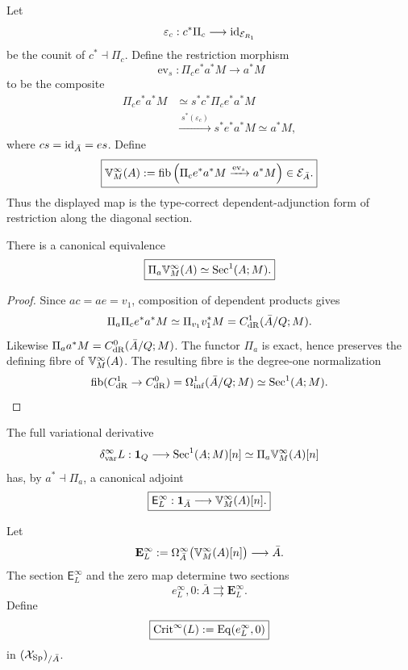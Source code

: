\begin{definition}
\label{def:var-full-local-coefficient}
Let
\[
    \varepsilon_c:
    c^*\Pi_c
    \longrightarrow
    \operatorname{id}_{\mathcal E_{R_1}}
\]
be the counit of \(c^*\dashv\Pi_c\).  Define the restriction morphism
\[
    \boxed{
    \operatorname{ev}_s:
    \Pi_ce^*a^*M
    \longrightarrow
    a^*M
    }
\]
to be the composite
\[
\begin{aligned}
    \Pi_ce^*a^*M
    &\simeq
    s^*c^*\Pi_ce^*a^*M\\
    &\xrightarrow{\;s^*(\varepsilon_c)\;}
    s^*e^*a^*M
    \simeq
    a^*M,
\end{aligned}
\]
where \(cs=\operatorname{id}_{\bar A}=es\).  Define
\[
    \boxed{
    \mathbb V^{\infty}_M(A)
    :=
    \operatorname{fib}\left(
      \Pi_c e^*a^*M
      \xrightarrow{\operatorname{ev}_s}
      a^*M
    \right)
    \in\mathcal E_{\bar A}.
    }
\]
Thus the displayed map is the type-correct dependent-adjunction form of restriction along the diagonal section.
\end{definition}

\begin{proposition}
\label{prop:var-full-local-pushforward}
There is a canonical equivalence
\[
    \boxed{
    \Pi_a\mathbb V^{\infty}_M(A)
    \simeq
    \operatorname{Sec}^1(A;M).
    }
\]
\end{proposition}

\begin{proof}
Since \(ac=ae=v_1\), composition of dependent products gives
\[
    \Pi_a\Pi_c e^*a^*M
    \simeq
    \Pi_{v_1}v_1^*M
    =
    C_{\mathrm{dR}}^1(\bar A/Q;M).
\]
Likewise \(\Pi_aa^*M=C_{\mathrm{dR}}^0(\bar A/Q;M)\). The functor \(\Pi_a\) is exact, hence preserves the defining fibre of \(\mathbb V^{\infty}_M(A)\). The resulting fibre is the degree-one normalization
\[
    \operatorname{fib}(C_{\mathrm{dR}}^1\to C_{\mathrm{dR}}^0)
    =
    \Omega_{\mathrm{inf}}^1(\bar A/Q;M)
    \simeq
    \operatorname{Sec}^1(A;M).
\]
\end{proof}

\begin{definition}
\label{def:var-full-euler-section}
The full variational derivative
\[
    \delta^{\infty}_{\mathrm{var}}L:
    \mathbf 1_Q\longrightarrow\operatorname{Sec}^1(A;M)[n]
    \simeq
    \Pi_a\mathbb V^{\infty}_M(A)[n]
\]
has, by \(a^*\dashv\Pi_a\), a canonical adjoint
\[
    \boxed{
    \mathsf E_L^{\infty}:
    \mathbf 1_{\bar A}\longrightarrow\mathbb V^{\infty}_M(A)[n].
    }
\]
\end{definition}

\begin{definition}
\label{def:var-full-critical}
Let
\[
    \mathbf E_L^{\infty}
    :=
    \Omega_{\bar A}^\infty\bigl(\mathbb V^{\infty}_M(A)[n]\bigr)
    \longrightarrow\bar A.
\]
The section \(\mathsf E_L^{\infty}\) and the zero map determine two sections
\[
    e_L^{\infty},0:\bar A\rightrightarrows\mathbf E_L^{\infty}.
\]
Define
\[
    \boxed{
    \operatorname{Crit}^{\infty}(L)
    :=
    \operatorname{Eq}(e_L^{\infty},0)
    }
\]
in \((\mathcal{X}_{\mathrm{Sp}})_{/\bar A}\).
\end{definition}

